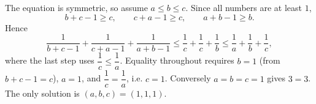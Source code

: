 The equation is symmetric, so assume $a\le b\le c$. Since all numbers are at least $1$,
\[b+c-1\ge c,\qquad c+a-1\ge c,\qquad a+b-1\ge b.\]
Hence
\[\dfrac{1}{b+c-1}+\dfrac{1}{c+a-1}+\dfrac{1}{a+b-1}\le\dfrac1c+\dfrac1c+\dfrac1b\le\dfrac1a+\dfrac1b+\dfrac1c,\]
where the last step uses $\dfrac1c\le\dfrac1a$. Equality throughout requires $b=1$ (from $b+c-1=c$), $a=1$, and $\dfrac1c=\dfrac1a$, i.e. $c=1$. Conversely $a=b=c=1$ gives $3=3$. The only solution is $\boxed{(a,b,c)=(1,1,1)}$.
